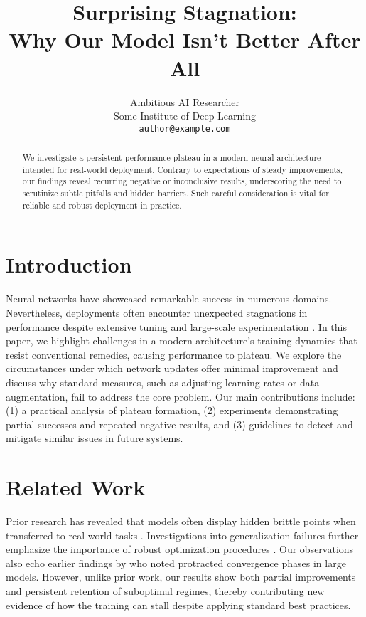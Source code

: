 \documentclass[11pt]{article}
\title{\bf Surprising Stagnation:\\
Why Our Model Isn't Better After All}
\author{
  Ambitious AI Researcher \\
  Some Institute of Deep Learning\\
  \texttt{author@example.com}
}
\date{}
\begin{document}
\maketitle

\begin{abstract}
We investigate a persistent performance plateau in a modern neural architecture
intended for real-world deployment. Contrary to expectations of steady improvements,
our findings reveal recurring negative or inconclusive results, underscoring the need
to scrutinize subtle pitfalls and hidden barriers. Such careful consideration is vital for
reliable and robust deployment in practice.
\end{abstract}

\vspace{-2mm}
\section{Introduction}
\vspace{-1mm}
Neural networks have showcased remarkable success in numerous domains.
Nevertheless, deployments often encounter unexpected stagnations in performance
despite extensive tuning and large-scale experimentation \citep{smith2020example}.
In this paper, we highlight challenges in a modern architecture's training dynamics
that resist conventional remedies, causing performance to plateau. We explore the
circumstances under which network updates offer minimal improvement and discuss
why standard measures, such as adjusting learning rates or data augmentation, fail
to address the core problem. Our main contributions include:
(1) a practical analysis of plateau formation, (2) experiments demonstrating partial
successes and repeated negative results, and (3) guidelines to detect and mitigate
similar issues in future systems.

\vspace{-2mm}
\section{Related Work}
\vspace{-1mm}
Prior research has revealed that models often display hidden brittle points when
transferred to real-world tasks \citep{johnson2021pitfalls}. Investigations into
generalization failures further emphasize the importance of robust optimization
procedures \citep{brown2022real}. Our observations also echo earlier findings
by \citet{torres2023stalled} who noted protracted convergence phases in large models.
However, unlike prior work, our results show both partial improvements and persistent
retention of suboptimal regimes, thereby contributing new evidence of how
the training can stall despite applying standard best practices.
\end{document}
